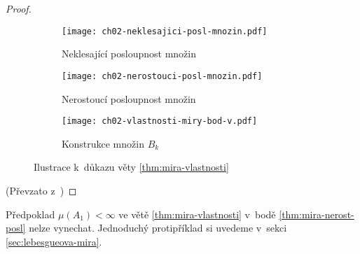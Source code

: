 \begin{proof}
\begin{figure}[h]
\begin{subfigure}{0.45\textwidth}
            \texttt{[image: ch02-neklesajici-posl-mnozin.pdf]}
            \caption{Neklesající posloupnost množin}
            \label{fig:nekl-posl-mnozin}
        \end{subfigure}
        \qquad
        \begin{subfigure}{0.45\textwidth}
            \texttt{[image: ch02-nerostouci-posl-mnozin.pdf]}
            \caption{Nerostoucí posloupnost množin}
            \label{fig:nerost-posl-mnozin}
        \end{subfigure}
        \begin{subfigure}{0.45\textwidth}
            \texttt{[image: ch02-vlastnosti-miry-bod-v.pdf]}
            \caption{Konstrukce množin $B_k$}
            \label{fig:vlastnosti-miry-bod-v}
        \end{subfigure}
        \caption{Ilustrace k~důkazu věty \ref{thm:mira-vlastnosti}}
    \end{figure}
    (Převzato z~\citep[str. 19]{NetukaIntegral2016})
\end{proof}
\begin{remark}
    Předpoklad $\mu(A_1)<\infty$ ve větě \ref{thm:mira-vlastnosti} v~bodě \ref{thm:mira-nerost-posl} nelze vynechat. Jednoduchý protipříklad si uvedeme v~sekci \ref{sec:lebesgueova-mira}.
\end{remark}